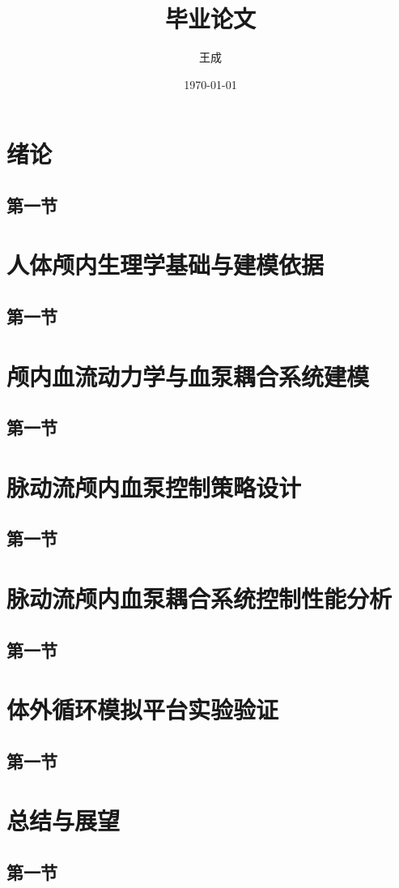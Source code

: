 \documentclass[12pt]{ctexart}
\title{毕业论文}
\author{王成}
\date{\today}
\begin{document}
\maketitle

\tableofcontents

\section{绪论}
\subsection{第一节}

\section{人体颅内生理学基础与建模依据}
\subsection{第一节}

\section{颅内血流动力学与血泵耦合系统建模}
\subsection{第一节}

\section{脉动流颅内血泵控制策略设计}
\subsection{第一节}

\section{脉动流颅内血泵耦合系统控制性能分析}
\subsection{第一节}

\section{体外循环模拟平台实验验证}
\subsection{第一节}

\section{总结与展望}
\subsection{第一节}
\end{document}
